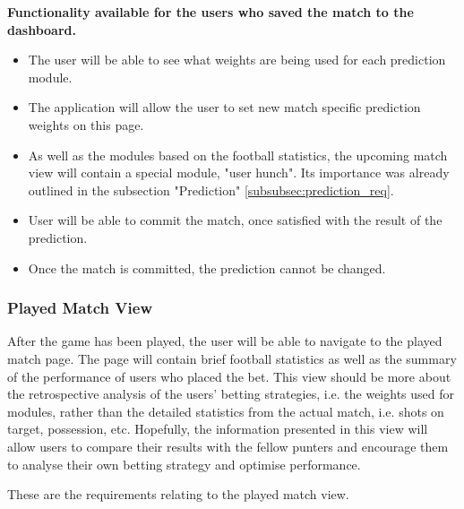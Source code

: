 \textbf{Functionality available for the users who saved the match to the dashboard.}
\begin{itemize}
	\item The user will be able to see what weights are being used for each prediction module.
    \item The application will allow the user to set new match specific prediction weights on this page.
    \item As well as the modules based on the football statistics, the upcoming match view will contain a special module, "user hunch". Its importance was already outlined in the subsection "Prediction" \ref{subsubsec:prediction_req}. 
    \item User will be able to commit the match, once satisfied with the result of the prediction.
    \item Once the match is committed, the prediction cannot be changed.
\end{itemize}

\subsubsection{Played Match View}
\label{subsubsec:playedmatch_req}
After the game has been played, the user will be able to navigate to the played match page. The page will contain brief football statistics as well as the summary of the performance of users who placed the bet. This view should be more about the retrospective analysis of the users' betting strategies, i.e. the weights used for modules, rather than the detailed statistics from the actual match, i.e. shots on target, possession, etc. Hopefully, the information presented in this view will allow users to compare their results with the fellow punters and encourage them to analyse their own betting strategy and optimise performance.

These are the requirements relating to the played match view.

